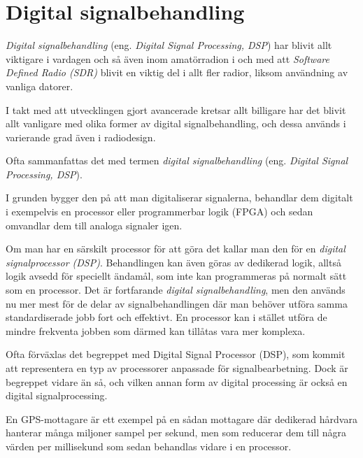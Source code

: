 \newpage
{}
\section{Digital signalbehandling}
\label{DSP}

\emph{Digital signalbehandling} (eng. \emph{Digital Signal Processing, DSP})
har blivit allt viktigare i vardagen och så även inom amatörradion i och med
att \emph{Software Defined Radio (SDR)} blivit en viktig del i allt fler
radior, liksom användning av vanliga datorer.

I takt med att utvecklingen gjort avancerade kretsar allt billigare har det
blivit allt vanligare med olika former av digital signalbehandling, och dessa
används i varierande grad även i radiodesign.

Ofta sammanfattas det med termen \emph{digital signalbehandling} (eng.
\emph{Digital Signal Processing, DSP}).

I grunden bygger den på att man digitaliserar signalerna, behandlar dem
digitalt i exempelvis en processor eller programmerbar logik (FPGA) och sedan
omvandlar dem till analoga signaler igen.

Om man har en särskilt processor för att göra det kallar man den för en
\emph{digital signalprocessor (DSP)}.
Behandlingen kan även göras av dedikerad logik, alltså logik avsedd för speciellt
ändamål, som inte kan programmeras på normalt sätt som en processor.
Det är fortfarande \emph{digital signalbehandling}, men den används nu mer mest
för de delar av signalbehandlingen där man behöver utföra samma standardiserade
jobb fort och effektivt.
En processor kan i stället utföra de mindre frekventa jobben som därmed kan
tillåtas vara mer komplexa.

Ofta förväxlas det begreppet med Digital Signal Processor (DSP), som kommit att
representera en typ av processorer anpassade för signalbearbetning.
Dock är begreppet vidare än så, och vilken annan form av digital processing är
också en digital signalprocessing.

En GPS-mottagare är ett exempel på en sådan mottagare där dedikerad hårdvara
hanterar många miljoner sampel per sekund, men som reducerar dem till några värden
per millisekund som sedan behandlas vidare i en processor.

